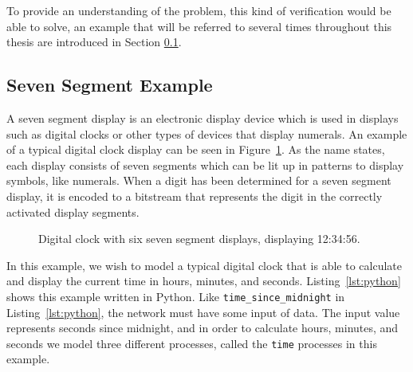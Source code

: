 To provide an understanding of the problem, this kind of verification would be able to solve, an example that will be referred to several times throughout this thesis are introduced in Section \ref{sec:example-seven_segment_intro}.

\subsection{Seven Segment Example}
\label{sec:example-seven_segment_intro}
A seven segment display is an electronic display device which is used in displays such as digital clocks or other types of devices that display numerals. An example of a typical digital clock display can be seen in Figure~\ref{fig:6_displays}. As the name states, each display consists of seven segments which can be lit up in patterns to display symbols, like numerals.
When a digit has been determined for a seven segment display, it is encoded to a bitstream that represents the digit in the correctly activated display segments.
\begin{figure}[!ht]
  \begin{center}
  \end{center}
  \caption{Digital clock with six seven segment displays, displaying 12:34:56.}
  \label{fig:6_displays}
\end{figure}
In this example, we wish to model a typical digital clock that is able to calculate and display the current time in hours, minutes, and seconds. Listing~\ref{lst:python} shows this example written in Python. Like \texttt{time\_since\_midnight} in Listing~\ref{lst:python}, the network must have some input of data. The input value represents seconds since midnight, and in order to calculate hours, minutes, and seconds we model three different processes, called the \texttt{time} processes in this example.\\

